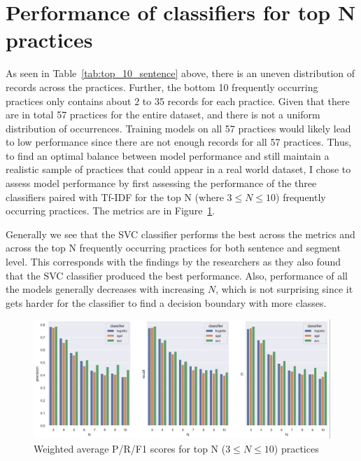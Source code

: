 \section{Performance of classifiers for top N practices}
As seen in Table~\ref{tab:top_10_sentence} above, there is an uneven distribution of records across the practices. Further, the bottom 10 frequently occurring practices only contains about 2 to 35 records for each practice. Given that there are in total 57 practices for the entire dataset, and there is not a uniform distribution of occurrences. Training models on all 57 practices would likely lead to low performance since there are not enough records for all 57 practices. Thus, to find an optimal balance between model performance and still maintain a realistic sample of practices that could appear in a real world dataset, I chose to assess model performance by first assessing the performance of the three classifiers paired with Tf-IDF for the top N (where $3 \le N \le 10$) frequently occurring practices. The metrics are in Figure~\ref{fig:top_n_practices}.

Generally we see that the SVC classifier performs the best across the metrics and across the top N frequently occurring practices for both sentence and segment level. This corresponds with the findings by the researchers as they also found that the SVC classifier produced the best performance. Also, performance of all the models generally decreases with increasing $N$, which is not surprising since it gets harder for the classifier to find a decision boundary with more classes.

\begin{figure}[!ht]
	\centering
	\includegraphics[width=1\textwidth]{figures/model_n_testing_sentence.png}      
    \caption{Weighted average P/R/F1 scores for top N ($3 \le N \le 10$) practices}
    \label{fig:top_n_practices}
\end{figure}



